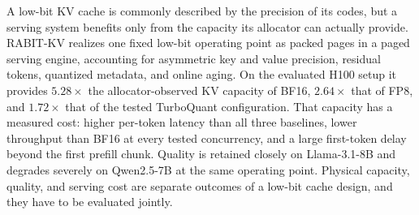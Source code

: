 \documentclass{article}
\begin{document}
A low-bit KV cache is commonly described by the precision of its codes, but a serving system benefits
only from the capacity its allocator can actually provide. RABIT-KV realizes one fixed low-bit
operating point as packed pages in a paged serving engine, accounting for asymmetric key and value
precision, residual tokens, quantized metadata, and online aging. On the evaluated H100 setup it
provides $5.28\times$ the allocator-observed KV capacity of BF16, $2.64\times$ that of FP8, and
$1.72\times$ that of the tested TurboQuant configuration. That capacity has a measured cost: higher
per-token latency than all three baselines, lower throughput than BF16 at every tested concurrency,
and a large first-token delay beyond the first prefill chunk. Quality is retained closely on
Llama-3.1-8B and degrades severely on Qwen2.5-7B at the same operating point. Physical capacity,
quality, and serving cost are separate outcomes of a low-bit cache design, and they have to be
evaluated jointly.



\end{document}
